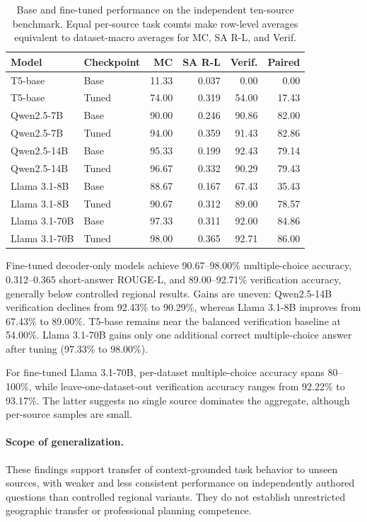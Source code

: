 \documentclass[a4paper,fleqn]{cas-sc}
\begin{document}
\begin{table}[htbp]
\centering
\small
\caption{Base and fine-tuned performance on the independent ten-source benchmark. Equal per-source task counts make row-level averages equivalent to dataset-macro averages for MC, SA R-L, and Verif.}
\label{tab:external_transfer}
\begin{tabular}{llrrrr}
\toprule
Model & Checkpoint & MC & SA R-L & Verif. & Paired \\
\midrule
T5-base & Base & 11.33 & 0.037 & 0.00 & 0.00 \\
T5-base & Tuned & 74.00 & 0.319 & 54.00 & 17.43 \\
Qwen2.5-7B & Base & 90.00 & 0.246 & 90.86 & 82.00 \\
Qwen2.5-7B & Tuned & 94.00 & 0.359 & 91.43 & 82.86 \\
Qwen2.5-14B & Base & 95.33 & 0.199 & 92.43 & 79.14 \\
Qwen2.5-14B & Tuned & 96.67 & 0.332 & 90.29 & 79.43 \\
Llama 3.1-8B & Base & 88.67 & 0.167 & 67.43 & 35.43 \\
Llama 3.1-8B & Tuned & 90.67 & 0.312 & 89.00 & 78.57 \\
Llama 3.1-70B & Base & 97.33 & 0.311 & 92.00 & 84.86 \\
Llama 3.1-70B & Tuned & 98.00 & 0.365 & 92.71 & 86.00 \\
\bottomrule
\end{tabular}
\end{table}

Fine-tuned decoder-only models achieve 90.67--98.00\% multiple-choice accuracy, 0.312--0.365 short-answer ROUGE-L, and 89.00--92.71\% verification accuracy, generally below controlled regional results. Gains are uneven: Qwen2.5-14B verification declines from 92.43\% to 90.29\%, whereas Llama 3.1-8B improves from 67.43\% to 89.00\%. T5-base remains near the balanced verification baseline at 54.00\%. Llama 3.1-70B gains only one additional correct multiple-choice answer after tuning (97.33\% to 98.00\%).

For fine-tuned Llama 3.1-70B, per-dataset multiple-choice accuracy spans 80--100\%, while leave-one-dataset-out verification accuracy ranges from 92.22\% to 93.17\%. The latter suggests no single source dominates the aggregate, although per-source samples are small.

\paragraph{Scope of generalization.}
These findings support transfer of context-grounded task behavior to unseen sources, with weaker and less consistent performance on independently authored questions than controlled regional variants. They do not establish unrestricted geographic transfer or professional planning competence.
\end{document}
